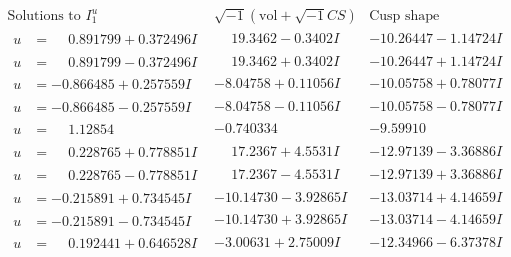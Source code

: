 \documentclass[1p]{elsarticle_modified}
\theoremstyle{definition}
\newcommand{\I}{\sqrt{-1}}
\begin{document}
$$\begin{array}{c|c|c}  
\text{Solutions to }I^u_{1}& \I (\text{vol} + \sqrt{-1}CS) & \text{Cusp shape}\\
 \hline 
\begin{aligned}
u &= \phantom{-}0.891799 + 0.372496 I\end{aligned}
 & \phantom{-}19.3462 - 0.3402 I & -10.26447 - 1.14724 I \\ \hline\begin{aligned}
u &= \phantom{-}0.891799 - 0.372496 I\end{aligned}
 & \phantom{-}19.3462 + 0.3402 I & -10.26447 + 1.14724 I \\ \hline\begin{aligned}
u &= -0.866485 + 0.257559 I\end{aligned}
 & -8.04758 + 0.11056 I & -10.05758 + 0.78077 I \\ \hline\begin{aligned}
u &= -0.866485 - 0.257559 I\end{aligned}
 & -8.04758 - 0.11056 I & -10.05758 - 0.78077 I \\ \hline\begin{aligned}
u &= \phantom{-}1.12854\phantom{ +0.000000I}\end{aligned}
 & -0.740334\phantom{ +0.000000I} & -9.59910\phantom{ +0.000000I} \\ \hline\begin{aligned}
u &= \phantom{-}0.228765 + 0.778851 I\end{aligned}
 & \phantom{-}17.2367 + 4.5531 I & -12.97139 - 3.36886 I \\ \hline\begin{aligned}
u &= \phantom{-}0.228765 - 0.778851 I\end{aligned}
 & \phantom{-}17.2367 - 4.5531 I & -12.97139 + 3.36886 I \\ \hline\begin{aligned}
u &= -0.215891 + 0.734545 I\end{aligned}
 & -10.14730 - 3.92865 I & -13.03714 + 4.14659 I \\ \hline\begin{aligned}
u &= -0.215891 - 0.734545 I\end{aligned}
 & -10.14730 + 3.92865 I & -13.03714 - 4.14659 I \\ \hline\begin{aligned}
u &= \phantom{-}0.192441 + 0.646528 I\end{aligned}
 & -3.00631 + 2.75009 I & -12.34966 - 6.37378 I \\ \hline\begin{aligned}

\end{aligned}
\end{array}$$
\end{document}
